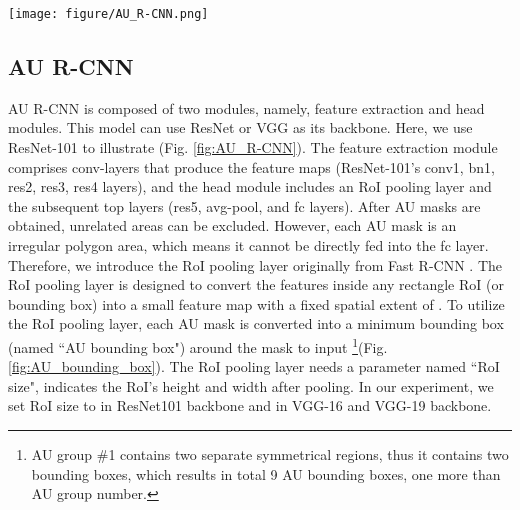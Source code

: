 \documentclass[5p,twocolumn]{elsarticle}
\begin{document}
\begin{figure*}[htbp]
	\begin{center}
		\texttt{[image: figure/AU\_R-CNN.png]}
	\end{center}
	\caption{AU R-CNN using ResNet-101 backbone architecture, where \#class denotes the AU category number we wish to discriminate.}
	\label{fig:AU_R-CNN}
	\vspace{-0.5cm}
\end{figure*}

\subsection{AU R-CNN}
\label{sec:AU_R-CNN}



AU R-CNN is composed of two modules, namely, feature extraction and head modules. This model can use ResNet \cite{he2016deep} or VGG \cite{Simonyan2014} as its backbone. Here, we use ResNet-101 to illustrate (Fig. \ref{fig:AU_R-CNN}). The feature extraction module comprises conv-layers that produce the feature maps (ResNet-101's conv1, bn1, res2, res3, res4 layers), and the head module includes an RoI pooling layer and the subsequent top layers (res5, avg-pool, and fc layers). After AU masks are obtained, unrelated areas can be excluded. However, each AU mask is an irregular polygon area, which means it cannot be directly fed into the fc layer. Therefore, we introduce the RoI pooling layer originally from Fast R-CNN \cite{girshick2015fast}. The RoI pooling layer is designed to convert the features inside any rectangle RoI (or bounding box) into a small feature map with a fixed spatial extent of . To utilize the RoI pooling layer, each AU mask is converted into a minimum bounding box (named ``AU bounding box") around the mask to input \footnote{AU group \#1 contains two separate symmetrical regions, thus it contains two bounding boxes, which results in total 9 AU bounding boxes, one more than AU group number.}(Fig. \ref{fig:AU_bounding_box}). The RoI pooling layer needs a parameter named ``RoI size", indicates the RoI's height and width after pooling. In our experiment, we set RoI size to  in ResNet101 backbone and  in VGG-16 and VGG-19 backbone. 
\end{document}
